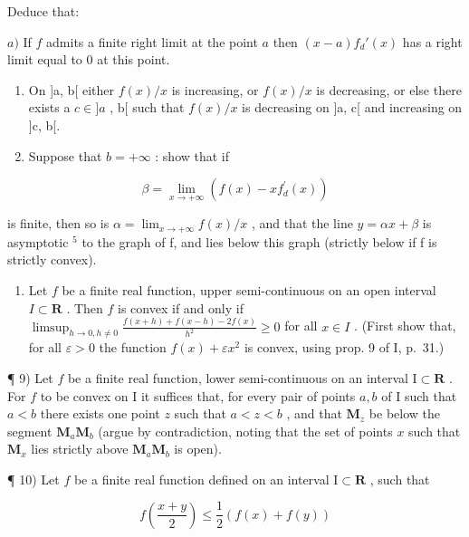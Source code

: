 Deduce that:

\(a)\) If \(f\) admits a finite right limit at the point \(a\) then \((x - a)f_d'(x)\) has a right limit equal to 0 at this point.

\begin{enumerate}
\def\labelenumi{\alph{enumi})}
\setcounter{enumi}{1}
\item
  On {]}a, b{[} either \(f(x)/x\) is increasing, or \(f(x)/x\) is decreasing, or else there exists a \(c \in ]a\) , b{[} such that \(f(x)/x\) is decreasing on {]}a, c{[} and increasing on {]}c, b{[}.
\item
  Suppose that \(b = +\infty\) : show that if
\end{enumerate}

\[
\beta = \lim _ {x \rightarrow + \infty} \left(f (x) - x f _ {d} ^ {\prime} (x)\right)
\]

is finite, then so is \(\alpha = \lim_{x \to +\infty} f(x) / x\) , and that the line \(y = \alpha x + \beta\) is asymptotic \(^{5}\) to the graph of f, and lies below this graph (strictly below if f is strictly convex).

\begin{enumerate}
\def\labelenumi{\arabic{enumi})}
\setcounter{enumi}{7}
\tightlist
\item
  Let \(f\) be a finite real function, upper semi-continuous on an open interval \(I \subset \mathbf{R}\) . Then \(f\) is convex if and only if \(\limsup_{h \to 0, h \neq 0} \frac{f(x + h) + f(x - h) - 2f(x)}{h^2} \geqslant 0\) for all \(x \in I\) . (First show that, for all \(\varepsilon > 0\) the function \(f(x) + \varepsilon x^2\) is convex, using prop. 9 of I, p.~31.)
\end{enumerate}

¶ 9) Let \(f\) be a finite real function, lower semi-continuous on an interval \(\mathrm{I} \subset \mathbf{R}\) . For \(f\) to be convex on \(\mathrm{I}\) it suffices that, for every pair of points \(a, b\) of \(\mathrm{I}\) such that \(a < b\) there exists one point \(z\) such that \(a < z < b\) , and that \(\mathbf{M}_z\) be below the segment \(\mathbf{M}_a\mathbf{M}_b\) (argue by contradiction, noting that the set of points \(x\) such that \(\mathbf{M}_x\) lies strictly above \(\mathbf{M}_a\mathbf{M}_b\) is open).

¶ 10) Let \(f\) be a finite real function defined on an interval \(\mathrm{I}\subset \mathbf{R}\) , such that

\[
f \left(\frac {x + y}{2}\right) \leqslant \frac {1}{2} (f (x) + f (y))
\]


